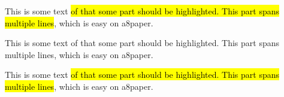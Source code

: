 \documentclass[12pt, a4paper, landscape]{scrartcl}
\begin{document}
\begin{multicols}{3}\raggedcolumns
  This is some text \hl{of that some part should be highlighted. This part
    spans multiple lines}, which is easy on a8paper.
\columnbreak

  This is some text {of that some part should be highlighted. This part
    spans multiple lines}, which is easy on a8paper.
\columnbreak

  This is some text \hl{of that some part should be highlighted. This part
    spans multiple lines}, which is easy on a8paper.
\end{multicols}
\end{document}
